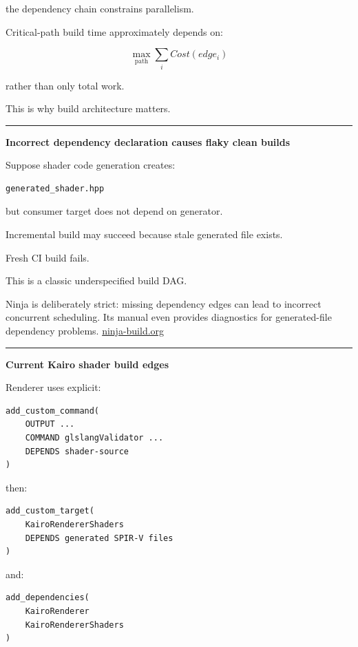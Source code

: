 the dependency chain constrains parallelism.

Critical-path build time approximately depends on:

\[
\boxed{
\max_{\text{path}}
\sum_i Cost(edge_i)
}
\]

rather than only total work.

This is why build architecture matters.

\begin{center}\rule{0.5\linewidth}{0.5pt}\end{center}

\textbf{Incorrect dependency declaration causes flaky clean builds}

Suppose shader code generation creates:

\begin{verbatim}
generated_shader.hpp
\end{verbatim}

but consumer target does not depend on generator.

Incremental build may succeed because stale generated file exists.

Fresh CI build fails.

This is a classic underspecified build DAG.

Ninja is deliberately strict: missing dependency edges can lead to incorrect concurrent scheduling. Its manual even provides  diagnostics for generated-file dependency problems. \href{https://ninja-build.org/manual.html?utm_source=chatgpt.com}{ninja-build.org}

\begin{center}\rule{0.5\linewidth}{0.5pt}\end{center}

\textbf{Current Kairo shader build edges}

Renderer uses explicit:

\begin{verbatim}
add_custom_command(
    OUTPUT ...
    COMMAND glslangValidator ...
    DEPENDS shader-source
)
\end{verbatim}

then:

\begin{verbatim}
add_custom_target(
    KairoRendererShaders
    DEPENDS generated SPIR-V files
)
\end{verbatim}

and:

\begin{verbatim}
add_dependencies(
    KairoRenderer
    KairoRendererShaders
)
\end{verbatim}


